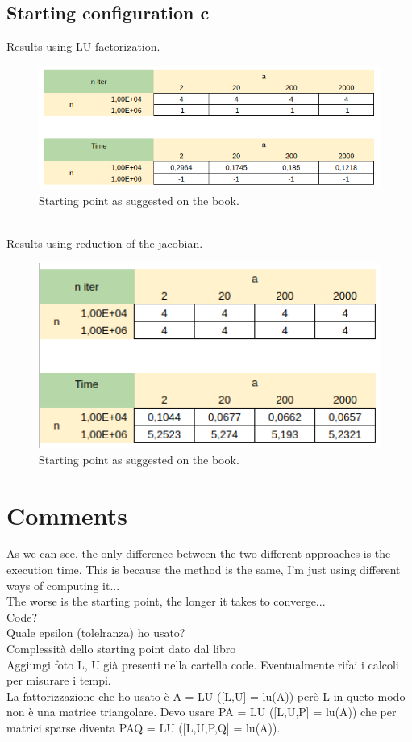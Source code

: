 \documentclass[]{article}
\begin{document}
\subsection{Starting configuration c}
Results using LU factorization.\\
\begin{figure}[h]
	\includegraphics[width=12cm]{table4.png}
	\caption{Starting point as suggested on the book.}
\end{figure}\\
Results using reduction of the jacobian.
\begin{figure}[h]
	\includegraphics[width=12cm]{table1.png}
	\caption{Starting point as suggested on the book.}
\end{figure}
\pagebreak
\section{Comments}
As we can see, the only difference between the two different approaches is the execution time. This is because the method is the same, I'm just using different ways of computing it...\\
The worse is the starting point, the longer it takes to converge...\\
Code?\\
Quale epsilon (tolelranza) ho usato?\\
Complessità dello starting point dato dal libro\\
Aggiungi foto L, U già presenti nella cartella code. Eventualmente rifai i calcoli per misurare i tempi.\\
La fattorizzazione che ho usato è A = LU ([L,U] = lu(A)) però L in queto modo non è una matrice triangolare. Devo usare PA = LU ([L,U,P] = lu(A)) che per matrici sparse diventa PAQ = LU ([L,U,P,Q] = lu(A)).\\
\end{document}
